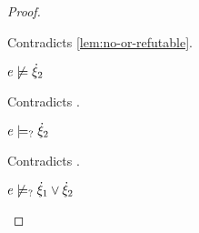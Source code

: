 \begin{proof}
\begin{byCases}
\begin{byCases}
\begin{byCases}
\begin{pfsteps*}
            \end{pfsteps*}
            Contradicts \autoref{lem:no-or-refutable}.
        \item[\text{(\ref{rule:CMSOr1})}]
            \begin{pfsteps*}
            \item $e \not\models \dot{\xi}_2$ 
            \end{pfsteps*}
            Contradicts .
        \item[\text{(\ref{rule:CMSOr2})}]
            \begin{pfsteps*}
            \item $e \models_{?} \dot{\xi}_2$ 
            \end{pfsteps*}
            Contradicts .
        \end{byCases}
        \begin{pfsteps*}
        \item $e \not\models_{?} \dot{\xi}_1 \vee \dot{\xi}_2$ 
        \end{pfsteps*}
        

\end{byCases}
\end{byCases}
\end{proof}
